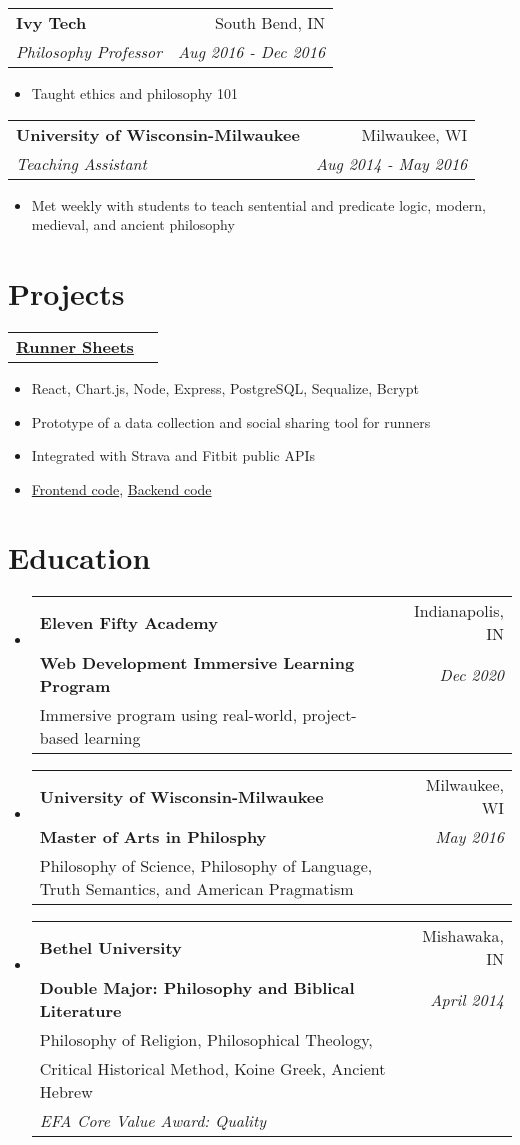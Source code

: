 \documentclass[letterpaper,11pt]{article}
\makeatletter
\newcommand{\resumeItem}[1]{
  \item\small{#1}
}
\newcommand{\resumeHeading}[4]{
    \begin{tabular*}{0.99\textwidth}[t]{l@{\extracolsep{\fill}}r}
      \textbf{#1} & #2 \\
      \textit{\small#3} & \textit{\small #4} \\
    \end{tabular*}\vspace{-5pt}
}
\newcommand{\projectHeading}[1]{
    \begin{tabular*}{0.99\textwidth}[t]{l@{\extracolsep{\fill}}r}
      \textbf{#1} \\
    \end{tabular*}\vspace{-5pt}
}
\newcommand{\educationEntryWithSevenPlaceholders}[7]{
  \vspace{-1pt}\item
    \begin{tabular*}{0.97\textwidth}[t]{l@{\extracolsep{\fill}}r}
      \textbf{#1} & #2 \\
      \textbf{\small#3} & \textit{\small #4} \\
      #5 \\
      #6 \\
      #7 \\
    \end{tabular*}\vspace{-5pt}
}
\newcommand{\educationEntryWithFivePlaceholders}[5]{
  \vspace{-1pt}\item
    \begin{tabular*}{0.97\textwidth}[t]{l@{\extracolsep{\fill}}r}
      \textbf{#1} & #2 \\
      \textbf{\small#3} & \textit{\small #4} \\
      #5 \\
    \end{tabular*}\vspace{-5pt}
}
\newcommand{\resumeSubHeadingListStart}{\begin{itemize}[leftmargin=*]}
\newcommand{\resumeSubHeadingListEnd}{\end{itemize}}
\newcommand{\resumeItemListStart}{\begin{itemize}}
\newcommand{\resumeItemListEnd}{\end{itemize}\vspace{-5pt}}
\makeatother
\begin{document}
  \resumeHeading{Ivy Tech}{South Bend, IN}{Philosophy Professor}{Aug 2016 - Dec 2016}
      \resumeItemListStart
        \resumeItem{Taught ethics and philosophy 101}
      \resumeItemListEnd

  \resumeHeading{University of Wisconsin-Milwaukee}{Milwaukee, WI}{Teaching Assistant}{Aug 2014 - May 2016}
      \resumeItemListStart
        \resumeItem{Met weekly with students to teach sentential and predicate logic, modern, medieval, and ancient philosophy}
      \resumeItemListEnd

\section{Projects}
  \projectHeading{\color{RoyalBlue}\href{https://runnersheetsclient.herokuapp.com}{Runner Sheets}}
      \resumeItemListStart
        \resumeItem{React, Chart.js, Node, Express, PostgreSQL, Sequalize, Bcrypt}
        \resumeItem{Prototype of a data collection and social sharing tool for runners}
        \resumeItem{Integrated with Strava and Fitbit public APIs}
        \resumeItem{\color{RoyalBlue}\href{https://github.com/jonnyschult/runnersheetsClient}{Frontend code}, \color{RoyalBlue}\href{https://github.com/jonnyschult/runnersheetsServer}{Backend code}}
      \resumeItemListEnd

\section{Education}
  \resumeSubHeadingListStart
    \educationEntryWithFivePlaceholders
      {Eleven Fifty Academy}
      {Indianapolis, IN}
      {Web Development Immersive Learning Program}
      {Dec 2020}
      {Immersive program using real-world, project-based learning}
  \resumeSubHeadingListEnd

  \resumeSubHeadingListStart
    \educationEntryWithFivePlaceholders
      {University of Wisconsin-Milwaukee}
      {Milwaukee, WI}
      {Master of Arts in Philosphy}
      {May 2016}
      {Philosophy of Science, Philosophy of Language, Truth Semantics, and American Pragmatism}
  \resumeSubHeadingListEnd

  \resumeSubHeadingListStart
    \educationEntryWithSevenPlaceholders
      {Bethel University}
      {Mishawaka, IN}
      {Double Major: Philosophy and Biblical Literature}
      {April 2014}
      {Philosophy of Religion, Philosophical Theology,}
      {Critical Historical Method, Koine Greek, Ancient Hebrew}
      {\textit{EFA Core Value Award: Quality}}
  \resumeSubHeadingListEnd
\end{document}
